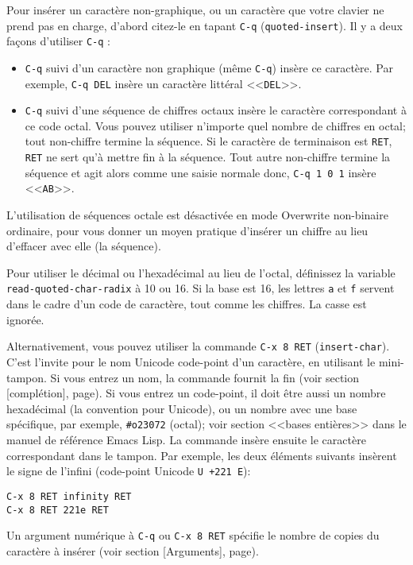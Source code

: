 Pour insérer un caractère non-graphique, ou un caractère que votre
clavier ne prend pas en charge, d'abord citez-le en tapant
\texttt{C-q} (\texttt{quoted-insert}). Il y a deux façons d'utiliser
\texttt{C-q} :
\begin{itemize}
\item \texttt{C-q} suivi d'un caractère non graphique (même
  \texttt{C-q}) insère ce caractère. Par exemple, \texttt{C-q DEL}
  insère un caractère littéral <<\texttt{DEL}>>.
\item \texttt{C-q} suivi d'une séquence de chiffres octaux insère le
  caractère correspondant à ce code octal. Vous pouvez utiliser
  n'importe quel nombre de chiffres en octal; tout non-chiffre termine
  la séquence. Si le caractère de terminaison est \texttt{RET},
  \texttt{RET} ne sert qu'à mettre fin à la séquence. Tout autre
  non-chiffre termine la séquence et agit alors comme une saisie
  normale donc, \texttt{C-q 1 0 1} insère <<\texttt{AB}>>.
\end{itemize}
L'utilisation de séquences octale est désactivée en mode Overwrite
non-binaire ordinaire, pour vous donner un moyen pratique d'insérer un
chiffre au lieu d'effacer avec elle (la séquence).\par

Pour utiliser le décimal ou l'hexadécimal au lieu de l'octal,
définissez la variable \texttt{read-quoted-char-radix} à 10 ou 16. Si
la base est 16, les lettres \texttt{a} et \texttt{f} servent dans
le cadre d'un code de caractère, tout comme les chiffres. La casse est
ignorée.\par 

Alternativement, vous pouvez utiliser la commande \texttt{C-x 8 RET}
(\texttt{insert-char}). C'est l'invite pour le nom Unicode code-point
d'un caractère, en utilisant le mini-tampon. Si vous entrez un nom, la
commande fournit la fin (voir section [complétion],
page). Si vous entrez un code-point, il doit être
aussi un nombre hexadécimal (la convention pour Unicode), ou un nombre
avec une base spécifique, par exemple, \texttt{\#{}o23072} (octal); voir
section <<bases entières>> dans le manuel de référence Emacs Lisp. La
commande insère ensuite le caractère correspondant dans le tampon. Par
exemple, les deux éléments suivants insèrent le signe de l'infini
(code-point Unicode \texttt{U +221 E}):
\begin{description}
\item[\texttt{C-x 8 RET infinity RET}] 
\item[\texttt{C-x 8 RET 221e RET}] 
\end{description}
Un argument numérique à \texttt{C-q} ou \texttt{C-x 8 RET} spécifie le
nombre de copies du caractère à insérer (voir section
[Arguments], page). \par

